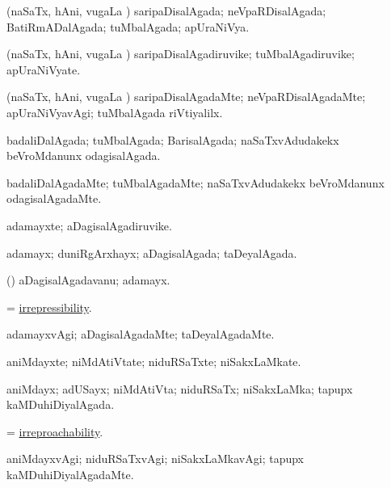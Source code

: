 \bentry
{}
\gl{\gu}
\bmng
(naSaTx, hAni, \mo vugaLa \vi) saripaDisalAgada; neVpaRDisalAgada; BatiRmADalAgada; tuMbalAgada; apUraNiVya. 
\emng
\eentry

\bentry
{}
\gl{\nA}
\bmng
(naSaTx, hAni, \mo vugaLa \vi) saripaDisalAgadiruvike; tuMbalAgadiruvike; apUraNiVyate. 
\emng
\eentry

\bentry
{}
\gl{\kirxvi}
\bmng
(naSaTx, hAni, \mo vugaLa \vi) saripaDisalAgadaMte; neVpaRDisalAgadaMte; apUraNiVyavAgi; tuMbalAgada riVtiyalilx. 
\emng
\eentry

\bentry
{}
\gl{\gu}
\bmng
badaliDalAgada; tuMbalAgada; BarisalAgada; naSaTxvAdudakekx beVroMdanunx odagisalAgada. 
\emng
\eentry

\bentry
{}
\gl{\kirxvi}
\bmng
badaliDalAgadaMte; tuMbalAgadaMte; naSaTxvAdudakekx beVroMdanunx odagisalAgadaMte. 
\emng
\eentry

\bentry
{}
\gl{\nA}
\bmng
adamayxte; aDagisalAgadiruvike. 
\emng
\eentry

\bentry
{}
\gl{\gu}
\bmng
adamayx; duniRgArxhayx; aDagisalAgada; taDeyalAgada. 
\emng
\eentry

\bentry
{}
\gl{\nA}
\bmng
(\AmA) aDagisalAgadavanu; adamayx. 
\emng
\eentry

\bentry
{}
\gl{\nA}
\bmng
=  \hyperlink{irrepressibility}{irrepressibility}. 
\emng
\eentry

\bentry
{}
\gl{\kirxvi}
\bmng
adamayxvAgi; aDagisalAgadaMte; taDeyalAgadaMte. 
\emng
\eentry

\bentry
{}
\gl{\nA}
\bmng
aniMdayxte; niMdAtiVtate; niduRSaTxte; niSakxLaMkate. 
\emng
\eentry

\bentry
{}
\gl{\gu}
\bmng
aniMdayx; adUSayx; niMdAtiVta; niduRSaTx; niSakxLaMka; tapupx kaMDuhiDiyalAgada. 
\emng
\eentry

\bentry
{}
\gl{\nA}
\bmng
=  \hyperlink{irreproachability}{irreproachability}. 
\emng
\eentry

\bentry
{}
\gl{\kirxvi}
\bmng
aniMdayxvAgi; niduRSaTxvAgi; niSakxLaMkavAgi; tapupx kaMDuhiDiyalAgadaMte. 
\emng
\eentry

